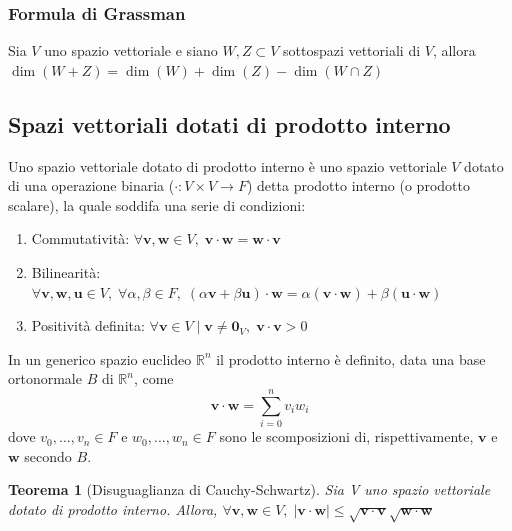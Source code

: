 \documentclass{article}
\newtheorem{theorem}{Teorema}
\begin{document}
    \vspace{10pt}
    \subsubsection{Formula di Grassman}
    Sia $V$ uno spazio vettoriale e siano $W, Z \subset V$ sottospazi vettoriali di $V$, allora $\dim(W + Z) = \dim(W) + \dim(Z) - \dim(W \cap Z)$



\vspace{10pt}
\subsection{Spazi vettoriali dotati di prodotto interno}
    Uno spazio vettoriale dotato di prodotto interno è uno spazio vettoriale $V$ dotato di una operazione binaria ($\cdot : V \times V \rightarrow F$) detta prodotto interno (o prodotto scalare), la quale soddifa una serie di condizioni:
    \begin{enumerate}[label=(\arabic*)]
        \item Commutatività: $\forall \mathbf{v}, \mathbf{w} \in V, \; \mathbf{v} \cdot \mathbf{w} = \mathbf{w} \cdot \mathbf{v}$
        \item Bilinearità: $\forall \mathbf{v}, \mathbf{w}, \mathbf{u} \in V, \; \forall \alpha, \beta \in F, \; (\alpha \mathbf{v} + \beta \mathbf{u}) \cdot \mathbf{w} = \alpha (\mathbf{v} \cdot \mathbf{w}) + \beta (\mathbf{u} \cdot \mathbf{w})$
        \item Positività definita: $\forall \mathbf{v} \in V \; | \; \mathbf{v} \neq \mathbf{0}_V, \; \mathbf{v} \cdot \mathbf{v} > 0$
    \end{enumerate}

    In un generico spazio euclideo $\mathbb{R}^{n}$ il prodotto interno è definito, data una base ortonormale $B$ di $\mathbb{R}^{n}$, come
    \[
        \mathbf{v} \cdot \mathbf{w} = \displaystyle \sum_{i = 0}^{n} v_i w_i
    \]
    dove $v_0,...,v_n \in F$ e $w_0,...,w_n \in F$ sono le scomposizioni di, rispettivamente, $\mathbf{v}$ e $\mathbf{w}$ secondo $B$. 

    \vspace{10pt}
    \begin{theorem}[Disuguaglianza di Cauchy-Schwartz]
        Sia V uno spazio vettoriale dotato di prodotto interno. Allora, $\forall \mathbf{v}, \mathbf{w} \in V, \; |\mathbf{v} \cdot \mathbf{w}| \leq \sqrt{\mathbf{v} \cdot \mathbf{v}}\sqrt{\mathbf{w} \cdot \mathbf{w}}$ 
    \end{theorem}
\end{document}
